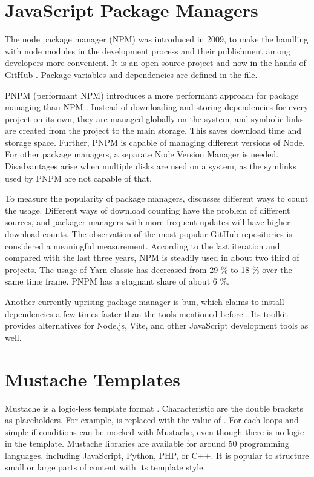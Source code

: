 \section{JavaScript Package Managers}

The node package manager (NPM) was introduced in 2009, to make the
handling with node modules in the development process and their
publishment among developers more convenient. It is an open source
project and now in the hands of GitHub \parencite{npm-website}. Package
variables and dependencies are defined in the  file.

PNPM (performant NPM) introduces a more performant approach for package
managing than NPM \cite{pnpm-website}. Instead of downloading and
storing dependencies for every project on its own, they are managed
globally on the system, and symbolic links are created from the project
to the main storage. This saves download time and storage space.
Further, PNPM is capable of managing different versions of Node. For
other package managers, a separate Node Version Manager is needed.
Disadvantages arise when multiple disks are used on a system, as the
symlinks used by PNPM are not capable of that.

To measure the popularity of package managers, \textcite{maj-article}
discusses different ways to count the usage. Different ways of download
counting have the problem of different sources, and packager managers
with more frequent updates will have higher download counts. The
observation of the most popular GitHub repositories is considered a
meaningful measurement. According to the last iteration
\cite{maj-repository} and compared with the last three years, NPM is
steadily used in about two third of projects. The usage of Yarn classic
has decreased from 29 \% to 18 \% over the same time frame. PNPM has a
stagnant share of about 6 \%.

Another currently uprising package manager is bun, which claims to
install dependencies a few times faster than the tools mentioned before
\parencite{bun-pm}. Its toolkit provides alternatives for Node.js, Vite,
and other JavaScript development tools as well.




\section{Mustache Templates}
\label{sec:mustache}

Mustache is a logic-less template format \parencite{mustache}.
Characteristic are the double \vname{{{}}} brackets as placeholders. For
example,  is replaced with the value of
. For-each loops and simple if conditions can be mocked
with Mustache, even though there is no logic in the template. Mustache
libraries are available for around 50 programming languages, including
JavaScript, Python, PHP, or C++. It is popular to structure small or
large parts of content with its template style.
